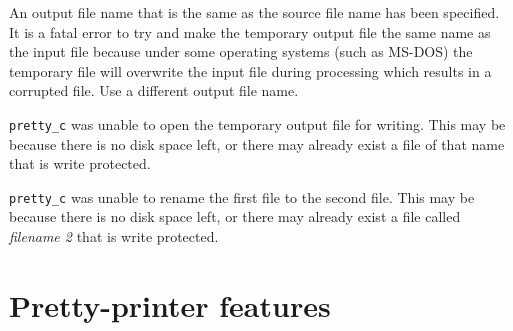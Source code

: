 An output file name that is the same as the source file name has been specified.
It is a fatal error to try and make the temporary output file the same name as the input file
because under some operating systems (such as MS-DOS) the temporary file will overwrite the
input file during processing which results in a corrupted file. Use a different
output file name.

\verb+pretty_c+ was unable to open the temporary output file
 for writing. This may be because there is no disk
space left, or there may already exist a file of that name that
is write protected.

\verb+pretty_c+ was unable to rename the first file to the second file.
This may be because there is no disk
space left, or there may already exist a file called {\em filename 2} that
is write protected.

\section{Pretty-printer features}

